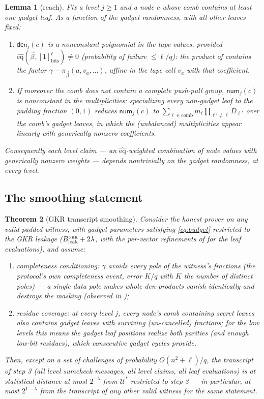\documentclass{article}
\newcommand{\eqf}{\widehat{\mathrm{eq}}}
\newcommand{\num}{\mathsf{num}}
\newcommand{\den}{\mathsf{den}}
\newtheorem{theorem}{Theorem}[section]
\newtheorem{lemma}[theorem]{Lemma}
\theoremstyle{definition}
\begin{document}
\begin{lemma}[reach]\label{lem:reach}
Fix a level $j \geq 1$ and a node $c$ whose comb contains at least one gadget leaf. As a function of the gadget randomness, with all other leaves fixed:
\begin{enumerate}
    \item $\den_j(c)$ is a nonconstant polynomial in the tape values, provided $\eqf(\vec\beta, [1]^{\ell}_{\mathrm{bits}}) \neq 0$ (probability of failure $\leq \ell / q$): the product of  contains the factor $\gamma - \pi_{\vec\beta}(a, v_a, \dots)$, affine in the tape cell $v_a$ with that coefficient.
    \item If moreover the comb does not contain a complete push-pull group, $\num_j(c)$ is nonconstant in the multiplicities: specializing every non-gadget leaf to the padding fraction $(0, 1)$ reduces $\num_j(c)$ to $\sum_{\ell \in \mathrm{comb}} m_\ell \prod_{\ell' \neq \ell} D_{\ell'}$ over the comb's gadget leaves, in which the (unbalanced) multiplicities appear linearly with generically nonzero coefficients.
\end{enumerate}
Consequently each level claim --- an $\eqf$-weighted combination of node values with generically nonzero weights --- depends nontrivially on the gadget randomness, at every level.
\end{lemma}

\subsection{The smoothing statement}

\begin{theorem}[GKR transcript smoothing]\label{conj:gkr}
Consider the honest prover on any valid padded witness, with gadget parameters satisfying \cref{eq:budget} restricted to the GKR leakage ($B^{\textsc{gkr}}_{\mathrm{leak}} + 2\lambda$, with the per-vector refinements of  for the leaf evaluations), and assume:
\begin{enumerate}
    \item \emph{completeness conditioning}: $\gamma$ avoids every pole of the witness's fractions (the protocol's own completeness event, error $K/q$ with $K$ the number of distinct poles) --- a single data pole makes whole den-products vanish identically and destroys the masking (observed in );
    \item \emph{residue coverage}: at every level $j$, every node's comb containing secret leaves also contains gadget leaves with surviving (un-cancelled) fractions; for the low levels this means the gadget leaf positions realize both parities (and enough low-bit residues), which consecutive gadget cycles provide.
\end{enumerate}
Then, except on a set of challenges of probability $O(n^2 + \ell)/q$, the transcript of step 3 (all level sumcheck messages, all level claims, all leaf evaluations) is at statistical distance at most $2^{-\lambda}$ from $\mathcal{U}^*$ restricted to step 3 --- in particular, at most $2^{1-\lambda}$ from the transcript of any other valid witness for the same statement.
\end{theorem}
\end{document}
